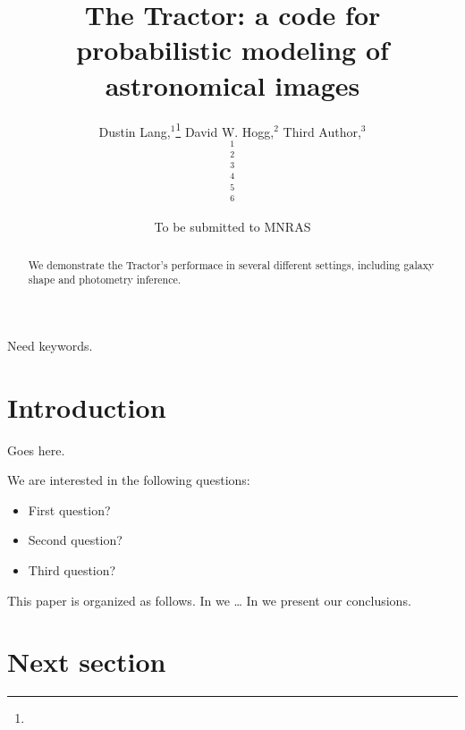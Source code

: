 \documentclass[useAMS,usenatbib]{mn2e}
\title[The Tractor]
{The Tractor: a code for probabilistic modeling of astronomical images}
\author[All of us]{%
  Dustin Lang,$^{1}$\thanks{\email}
  David W. Hogg,$^{2}$
  Third Author,$^{3}$
\newauthor{%
  Fourth Author,$^{4}$
  Fifth Author,$^{5}$
  Sixth Author.$^{6}$}
  \medskip\\
  $^1$\cmu\\
  $^2$\nyu\\
  $^3$\thirdplace\\
  $^4$\fourthplace\\
  $^5$\fifthplace\\
  $^6$\sixthplace\\
}
\begin{document}
             
\date{To be submitted to MNRAS}
             
\pagerange{\pageref{firstpage}--\pageref{lastpage}}

\maketitle

\label{firstpage}


\begin{abstract}
We demonstrate the Tractor's performace in several different
settings, including galaxy shape and photometry inference.
\end{abstract}

\begin{keywords}
  Need keywords.
\end{keywords}


\section{Introduction}

Goes here.

We are interested in the following questions:

\begin{itemize}

\item First question?

\item Second question? 

\item Third question? 

\end{itemize}

This paper is organized as follows. In  we \ldots
In  we present our conclusions.



\section{Next section}
\label{sec:next}
\end{document}

